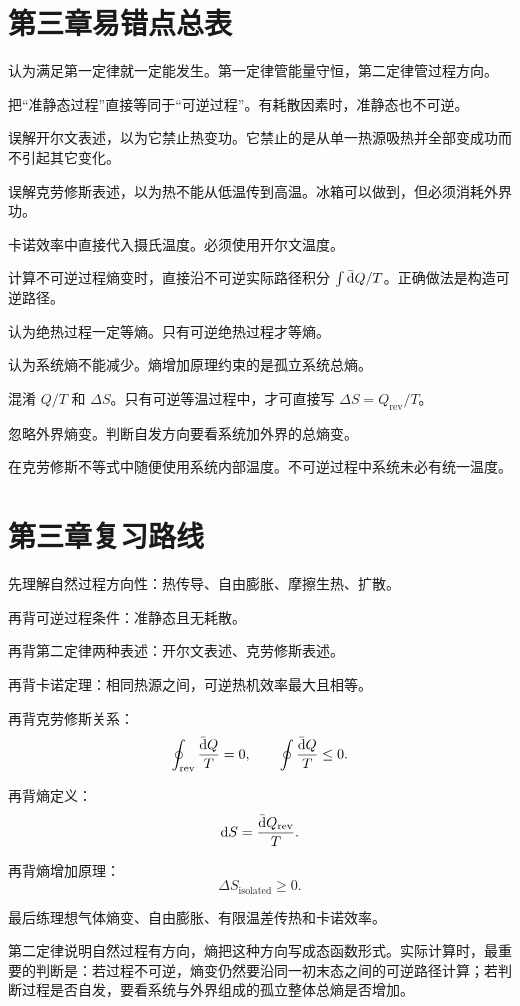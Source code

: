 \section{第三章易错点总表}

\begin{WarnBox}[本章高频错误]
\begin{PitfallList}
  \item 认为满足第一定律就一定能发生。第一定律管能量守恒，第二定律管过程方向。
  \item 把“准静态过程”直接等同于“可逆过程”。有耗散因素时，准静态也不可逆。
  \item 误解开尔文表述，以为它禁止热变功。它禁止的是从单一热源吸热并全部变成功而不引起其它变化。
  \item 误解克劳修斯表述，以为热不能从低温传到高温。冰箱可以做到，但必须消耗外界功。
  \item 卡诺效率中直接代入摄氏温度。必须使用开尔文温度。
  \item 计算不可逆过程熵变时，直接沿不可逆实际路径积分 \(\int \mathop{}\!\bar{\mathrm{d}} Q/T\)。正确做法是构造可逆路径。
  \item 认为绝热过程一定等熵。只有可逆绝热过程才等熵。
  \item 认为系统熵不能减少。熵增加原理约束的是孤立系统总熵。
  \item 混淆 \(Q/T\) 和 \(\Delta S\)。只有可逆等温过程中，才可直接写 \(\Delta S=Q_{\mathrm{rev}}/T\)。
  \item 忽略外界熵变。判断自发方向要看系统加外界的总熵变。
  \item 在克劳修斯不等式中随便使用系统内部温度。不可逆过程中系统未必有统一温度。
\end{PitfallList}
\end{WarnBox}

\section{第三章复习路线}

\begin{MethodBox}[建议背诵顺序]
\begin{ReviewList}
  \item 先理解自然过程方向性：热传导、自由膨胀、摩擦生热、扩散。
  \item 再背可逆过程条件：准静态且无耗散。
  \item 再背第二定律两种表述：开尔文表述、克劳修斯表述。
  \item 再背卡诺定理：相同热源之间，可逆热机效率最大且相等。
  \item 再背克劳修斯关系：
  \[
    \oint_{\mathrm{rev}}\frac{\mathop{}\!\bar{\mathrm{d}} Q}{T}=0,
    \qquad
    \oint\frac{\mathop{}\!\bar{\mathrm{d}} Q}{T}\le0.
  \]
  \item 再背熵定义：
  \[
    \mathop{}\!\mathrm{d} S=\frac{\mathop{}\!\bar{\mathrm{d}} Q_{\mathrm{rev}}}{T}.
  \]
  \item 再背熵增加原理：
  \[
    \Delta S_{\mathrm{isolated}}\ge0.
  \]
  \item 最后练理想气体熵变、自由膨胀、有限温差传热和卡诺效率。
\end{ReviewList}
\end{MethodBox}

\begin{KeyBox}[第三章一句话总结]
第二定律说明自然过程有方向，熵把这种方向写成态函数形式。实际计算时，最重要的判断是：若过程不可逆，熵变仍然要沿同一初末态之间的可逆路径计算；若判断过程是否自发，要看系统与外界组成的孤立整体总熵是否增加。
\end{KeyBox}